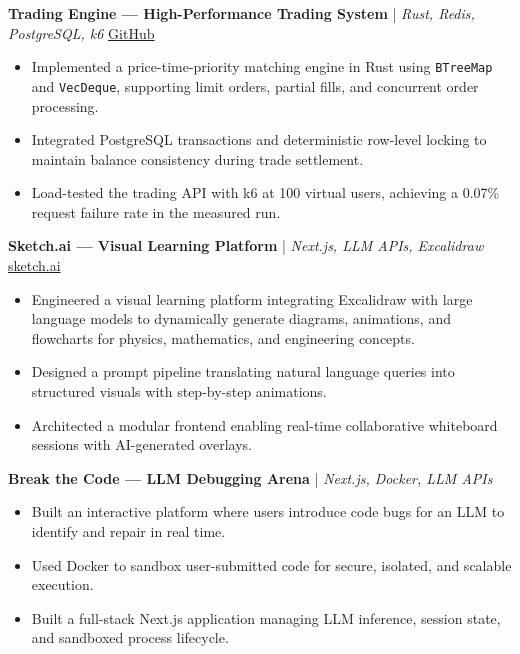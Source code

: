 \documentclass[a4paper,9pt]{article}
\begin{document}
\textbf{Trading Engine --- High-Performance Trading System} | \textit{Rust, Redis, PostgreSQL, k6}
\quad \href{https://github.com/rizzabhdwaj/trading-system/}{GitHub}

\begin{itemize}
    \item Implemented a price-time-priority matching engine in Rust using \texttt{BTreeMap} and \texttt{VecDeque}, supporting limit orders, partial fills, and concurrent order processing.
    \item Integrated PostgreSQL transactions and deterministic row-level locking to maintain balance consistency during trade settlement.
    \item Load-tested the trading API with k6 at 100 virtual users, achieving a 0.07\% request failure rate in the measured run.
\end{itemize}

\vspace{1pt}

\textbf{Sketch.ai --- Visual Learning Platform} | \textit{Next.js, LLM APIs, Excalidraw}
\quad \href{https://sketch-ai-six.vercel.app/}{sketch.ai}

\begin{itemize}
    \item Engineered a visual learning platform integrating Excalidraw with large language models to dynamically generate diagrams, animations, and flowcharts for physics, mathematics, and engineering concepts.
    \item Designed a prompt pipeline translating natural language queries into structured visuals with step-by-step animations.
    \item Architected a modular frontend enabling real-time collaborative whiteboard sessions with AI-generated overlays.
\end{itemize}

\vspace{1pt}

\textbf{Break the Code --- LLM Debugging Arena} | \textit{Next.js, Docker, LLM APIs}

\begin{itemize}
    \item Built an interactive platform where users introduce code bugs for an LLM to identify and repair in real time.
    \item Used Docker to sandbox user-submitted code for secure, isolated, and scalable execution.
    \item Built a full-stack Next.js application managing LLM inference, session state, and sandboxed process lifecycle.
\end{itemize}
\end{document}
